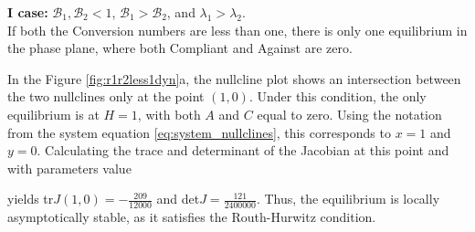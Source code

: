 \noindent\textbf{I case: }$\mathcal{B}_1, \mathcal{B}_2 <1$, $\mathcal{B}_1 >  \mathcal{B}_2$, and $\lambda_1 > \lambda_2$. \\
If both the Conversion numbers are less than one, there is only one equilibrium in the phase plane, where both Compliant and Against are zero.

In the Figure \ref{fig:r1r2less1dyn}a, the nullcline plot shows an intersection between the two nullclines only at the point $(1,0)$. Under this condition, the only equilibrium is at $H = 1$, with both $A$ and $C$ equal to zero. Using the notation from the system equation \eqref{eq:system_nullclines}, this corresponds to $x = 1$ and $y = 0$. Calculating the trace and determinant of the Jacobian at this point and with parameters value


yields tr$J(1,0) = -\frac{209}{12000}$ and det$J = \frac{121}{2400000}$. Thus, the equilibrium is locally asymptotically stable, as it satisfies the Routh-Hurwitz condition.\\

